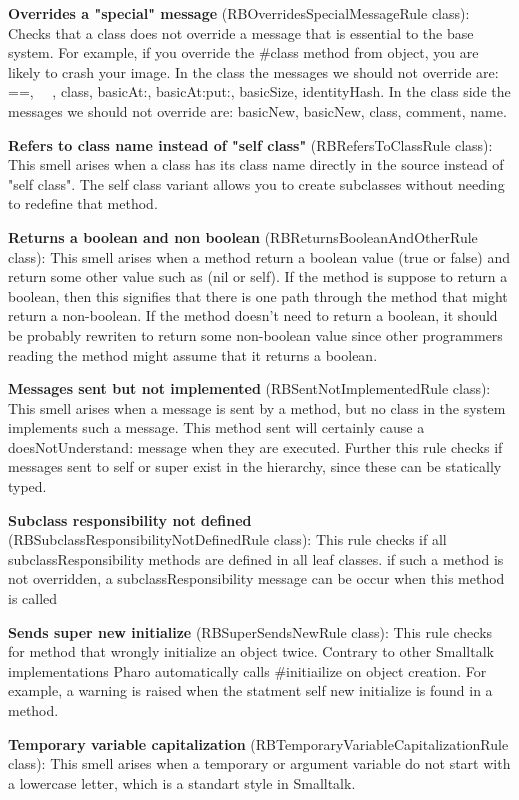 \textbf{Overrides a "special" message} (RBOverridesSpecialMessageRule class): Checks that a class does not override a message that is essential to the base system. For example, if you override the \#class method from object, you are likely to crash your image.
In the class the messages we should not override are: ==, ~~, class, basicAt:, basicAt:put:, basicSize, identityHash.
In the class side the messages we should not override are: basicNew, basicNew, class, comment, name.

\textbf{Refers to class name instead of "self class"} (RBRefersToClassRule class): This smell arises when a class has its class name directly in the source instead of "self class". The self class variant allows you to create subclasses without needing to redefine that method.

\textbf{Returns a boolean and non boolean} (RBReturnsBooleanAndOtherRule class): This smell arises when a method return a boolean value (true or false) and return some other value such as (nil or self). If the method is suppose to return a boolean, then this signifies that there is one path through the method that might return a non-boolean. If the method doesn't need to return a boolean, it should be probably rewriten to return some non-boolean value since other programmers reading the method might assume that it returns a boolean.

\textbf{Messages sent but not implemented} (RBSentNotImplementedRule class): This smell arises when a message is sent by a method,  but no class in the system implements such a message. This method sent will certainly cause a doesNotUnderstand: message when they are executed.  Further this rule checks if messages sent to self or super exist in the hierarchy, since these can be statically typed.

\textbf{Subclass responsibility not defined} (RBSubclassResponsibilityNotDefinedRule class): This rule checks if all subclassResponsibility methods are defined in all leaf classes. if such a method is not overridden, a subclassResponsibility message can be occur when this method is called

\textbf{Sends super new initialize} (RBSuperSendsNewRule class):  This rule checks for method that wrongly initialize an object twice. Contrary to other Smalltalk implementations Pharo automatically calls \#initiailize on object creation.
For example, a warning is raised when the statment self new initialize is found in a method.

\textbf{Temporary variable capitalization} (RBTemporaryVariableCapitalizationRule class): This smell arises when a temporary or argument variable do not start with a lowercase letter, which is a standart style in Smalltalk.

